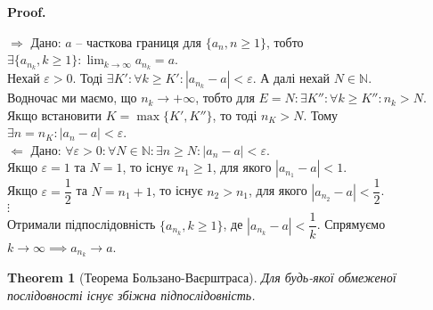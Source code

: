 \documentclass[a4paper, 14pt]{article}
\makeatletter
\def\qed{$\blacksquare$}
\def\rightproof{$\boxed{\Rightarrow}$ }
\def\leftproof{$\boxed{\Leftarrow}$ }
\theoremstyle{theoremdd}
\newtheorem{theorem}{Theorem}[subsection]
\theoremstyle{theoremdd}
\theoremstyle{theoremdd}
\theoremstyle{theoremdd}
\theoremstyle{theoremdd}
\theoremstyle{theoremdd}
\theoremstyle{theoremdd}
\theoremstyle{theoremdd}
\renewenvironment{proof}[1][Proof.\\]{\par
\pushQED{\hfill \qed}%
\normalfont \topsep6\p@\@plus6\p@\relax
\trivlist
\item\relax
{\bfseries
#1\@addpunct{.}}\hspace\labelsep\ignorespaces
}{%
\popQED\endtrivlist\@endpefalse
}
\makeatother
\begin{document}
	\begin{proof}
	\rightproof Дано: $a$ -- часткова границя для $\{a_n, n \geq 1\}$, тобто $\exists \{a_{n_k}, k \geq 1\}: \displaystyle \lim_{k \to \infty} a_{n_k} = a$.\\
	Нехай $\varepsilon > 0$. Тоді $\exists K': \forall k \geq K': |a_{n_k} - a| < \varepsilon$. А далі нехай $N \in \mathbb{N}$.\\
	Водночас ми маємо, що $n_k \to +\infty$, тобто для $E = N: \exists K'': \forall k \geq K'': n_k > N$.\\
	Якщо встановити $K = \max\{K', K''\}$, то тоді $n_K > N$. Тому $\exists n = n_K: |a_n-a|<\varepsilon$.
	\bigskip \\
	\leftproof Дано: $\forall \varepsilon > 0: \forall N \in \mathbb{N}: \exists n \geq N: |a_n-a| < \varepsilon$.\\
	Якщо $\varepsilon = 1$ та $N = 1$, то існує $n_1 \geq 1$, для якого $|a_{n_1}-a| < 1$.\\
	Якщо $\varepsilon = \dfrac{1}{2}$ та $N = n_{1}+1$, то існує $n_2 > n_1$, для якого $|a_{n_2}-a| < \dfrac{1}{2}$.\\
	$\vdots$\\
	Отримали підпослідовність $\{a_{n_k}, k \geq 1\}$, де $|a_{n_k} - a| < \dfrac{1}{k}$. Спрямуємо $k \to \infty \implies a_{n_k} \to a$.
	\end{proof}
	
	\begin{theorem}[Теорема Бользано-Ваєрштраса]
	Для будь-якої обмеженої послідовності існує збіжна підпослідовність.
	\end{theorem}
	
\end{document}
